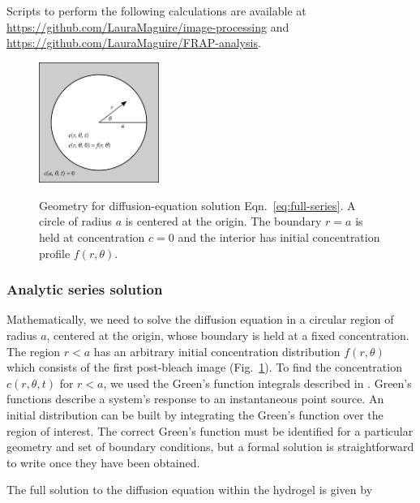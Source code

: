 Scripts to perform the following calculations are available at \url{https://github.com/LauraMaguire/image-processing} and \url{https://github.com/LauraMaguire/FRAP-analysis}.

\begin{figure}
\caption[Geometry for Fourier transform solution.]{Geometry for diffusion-equation solution Eqn.~\ref{eq:full-series}.  A circle of radius $a$ is centered at the origin.  The boundary $r=a$ is held at concentration $c=0$ and the interior has initial concentration profile $f(r,\theta)$.}
\centering
\includegraphics[width=0.35\textwidth]{figs/ch04/carslaw-geometry}
\label{fig:carslaw-geo}
\end{figure} 

\subsubsection{Analytic series solution}

Mathematically, we need to solve the diffusion equation in a circular region of radius $a$, centered at the origin, whose boundary is held at a fixed concentration.  The region $r<a$ has an arbitrary initial concentration distribution $f(r,\theta)$ which consists of the first post-bleach image (Fig.~\ref{fig:carslaw-geo}).  To find the concentration $c(r,\theta,t)$ for $r<a$, we used the Green's function integrals described in \cite{h.s.carslaw59}.  Green's functions describe a system's response to an instantaneous point source.  An initial distribution can be built by integrating the Green's function over the region of interest.  The correct Green's function must be identified for a particular geometry and set of boundary conditions, but a formal solution is straightforward to write once they have been obtained.

The full solution to the diffusion equation within the hydrogel is given by \cite{h.s.carslaw59}

